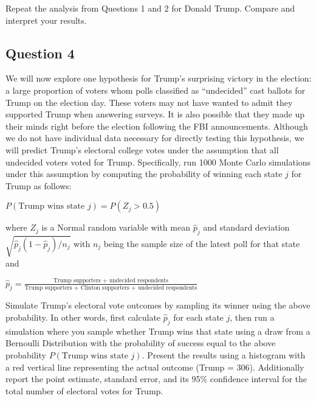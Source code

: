 \documentclass[]{article}
\begin{document}
Repeat the analysis from Questions 1 and 2 for Donald Trump. Compare and
interpret your results.

\subsection{Question 4}\label{question-4}

We will now explore one hypothesis for Trump's surprising victory in the
election: a large proportion of voters whom polls classified as
``undecided'' cast ballots for Trump on the election day. These voters
may not have wanted to admit they supported Trump when answering
surveys. It is also possible that they made up their minds right before
the election following the FBI announcements. Although we do not have
individual data necessary for directly testing this hypothesis, we will
predict Trump's electoral college votes under the assumption that all
undecided voters voted for Trump. Specifically, run 1000 Monte Carlo
simulations under this assumption by computing the probability of
winning each state $j$ for Trump as follows:

$P(\text{Trump wins state } j) = P(Z_j  > 0.5)$

where $Z_j$ is a Normal random variable with mean $\hat{p}_j$ and
standard deviation $\sqrt{\hat{p}_j(1-\hat{p}_j)/n_j}$ with $n_j$ being
the sample size of the latest poll for that state and

$\hat{p}_j = \frac{\text{Trump supporters + undecided respondents}}{\text{Trump supporters + Clinton supporters + undecided respondents}}$

Simulate Trump's electoral vote outcomes by sampling its winner using
the above probability. In other words, first calculate $\hat{p}_j$ for
each state $j$, then run a simulation where you sample whether Trump
wins that state using a draw from a Bernoulli Distribution with the
probability of success equal to the above probability
$P(\text{Trump wins state } j)$. Present the results using a histogram
with a red vertical line representing the actual outcome (Trump = 306).
Additionally report the point estimate, standard error, and its 95\%
confidence interval for the total number of electoral votes for Trump.
\end{document}
